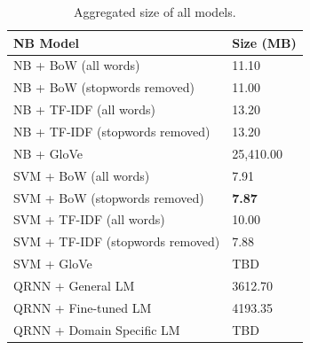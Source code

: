 \documentclass[a4paper,twoside,phd]{BYUPhys}
\begin{document}
\begin{table}[H]
	\centering
	
	\begin{tabular}{|p{4.2cm}|p{5cm}|}
		\hline
		
		\textbf{NB Model} & \textbf{Size (MB)}                                                                                                                                                                                                                                                                                                                                                    \\
		\hline                                                                                                                                              
		
		NB + BoW (all words)  & 11.10  \\
		\hline
		
		NB + BoW \newline (stopwords  removed)  & 11.00 \\
		\hline
		
		NB + TF-IDF \newline (all words) & 13.20 \\
		\hline
		
		NB + TF-IDF \newline (stopwords removed) & 13.20 \\
		\hline
		
		NB + GloVe & 25,410.00 \\
		\hline
		
		SVM + BoW  (all words)  & 7.91  \\
		\hline
		
		SVM + BoW \newline (stopwords removed)  & \textbf{7.87}  \\
		\hline
		
		SVM + TF-IDF \newline (all words) & 10.00 \\
		\hline
		
		SVM + TF-IDF \newline (stopwords removed) & 7.88 \\
		\hline
		
		SVM + GloVe & TBD \\
		\hline
		
		QRNN + \newline General LM  & 3612.70  \\
		\hline
		
		QRNN + \newline Fine-tuned LM  & 4193.35  \\
		\hline
		
		QRNN + \newline Domain Specific LM & TBD \\
		\hline
		
		
	\end{tabular}
	\caption{Aggregated size of all models.}
	\label{table:NBStorageRequirements}
\end{table}
\end{document}
